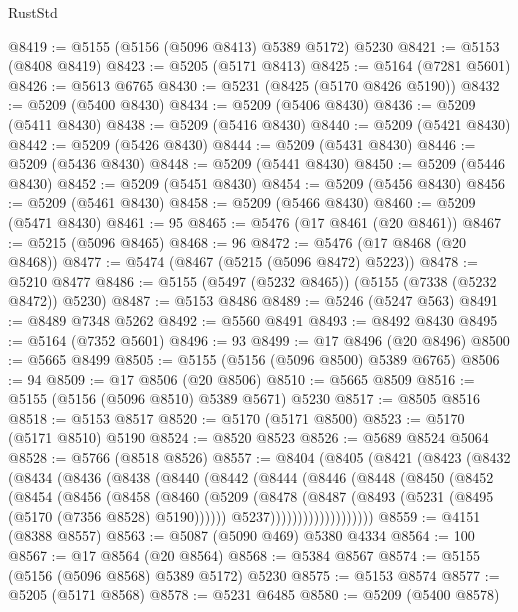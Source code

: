 \begin{lexlean}{RustStd}
\begin{coremodule}
@8419 := @5155 (@5156 (@5096 @8413) @5389 @5172) @5230
@8421 := @5153 (@8408 @8419)
@8423 := @5205 (@5171 @8413)
@8425 := @5164 (@7281 @5601)
@8426 := @5613 @6765
@8430 := @5231 (@8425 (@5170 @8426 @5190))
@8432 := @5209 (@5400 @8430)
@8434 := @5209 (@5406 @8430)
@8436 := @5209 (@5411 @8430)
@8438 := @5209 (@5416 @8430)
@8440 := @5209 (@5421 @8430)
@8442 := @5209 (@5426 @8430)
@8444 := @5209 (@5431 @8430)
@8446 := @5209 (@5436 @8430)
@8448 := @5209 (@5441 @8430)
@8450 := @5209 (@5446 @8430)
@8452 := @5209 (@5451 @8430)
@8454 := @5209 (@5456 @8430)
@8456 := @5209 (@5461 @8430)
@8458 := @5209 (@5466 @8430)
@8460 := @5209 (@5471 @8430)
@8461 := 95
@8465 := @5476 (@17 @8461 (@20 @8461))
@8467 := @5215 (@5096 @8465)
@8468 := 96
@8472 := @5476 (@17 @8468 (@20 @8468))
@8477 := @5474 (@8467 (@5215 (@5096 @8472) @5223))
@8478 := @5210 @8477
@8486 := @5155 (@5497 (@5232 @8465)) (@5155 (@7338 (@5232 @8472)) @5230)
@8487 := @5153 @8486
@8489 := @5246 (@5247 @563)
@8491 := @8489 @7348 @5262
@8492 := @5560 @8491
@8493 := @8492 @8430
@8495 := @5164 (@7352 @5601)
@8496 := 93
@8499 := @17 @8496 (@20 @8496)
@8500 := @5665 @8499
@8505 := @5155 (@5156 (@5096 @8500) @5389 @6765)
@8506 := 94
@8509 := @17 @8506 (@20 @8506)
@8510 := @5665 @8509
@8516 := @5155 (@5156 (@5096 @8510) @5389 @5671) @5230
@8517 := @8505 @8516
@8518 := @5153 @8517
@8520 := @5170 (@5171 @8500)
@8523 := @5170 (@5171 @8510) @5190
@8524 := @8520 @8523
@8526 := @5689 @8524 @5064
@8528 := @5766 (@8518 @8526)
@8557 := @8404
    (@8405
      (@8421
        (@8423
          (@8432
            (@8434
              (@8436
                (@8438
                  (@8440
                    (@8442
                      (@8444
                        (@8446
                          (@8448
                            (@8450
                              (@8452
                                (@8454
                                  (@8456
                                    (@8458
                                      (@8460
                                        (@5209
                                          (@8478
                                            (@8487
                                              (@8493 (@5231 (@8495 (@5170 (@7356 @8528) @5190))))))
                                          @5237)))))))))))))))))))
@8559 := @4151 (@8388 @8557)
@8563 := @5087 (@5090 @469) @5380 @4334
@8564 := 100
@8567 := @17 @8564 (@20 @8564)
@8568 := @5384 @8567
@8574 := @5155 (@5156 (@5096 @8568) @5389 @5172) @5230
@8575 := @5153 @8574
@8577 := @5205 (@5171 @8568)
@8578 := @5231 @6485
@8580 := @5209 (@5400 @8578)

\end{coremodule}
\end{lexlean}

